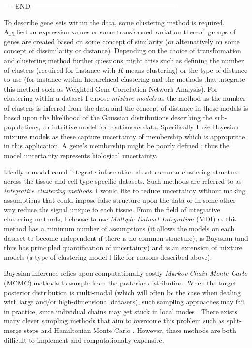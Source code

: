 \documentclass[12pt]{article} %
\begin{document}
	---- END -----------------------------------------------------------------
	
	To describe gene sets within the data, some clustering method is required. Applied on expression values or some transformed variation thereof, groups of genes are created based on some concept of similarity (or alternatively on some concept of dissimilarity or distance). Depending on the choice of transformation and clustering method further questions might arise such as defining the number of clusters (required for instance with $K$-means clustering) or the type of distance to use (for instance within hierarchical clustering and the methods that integrate this method such as Weighted Gene Correlation Network Analysis). For clustering within a dataset I choose \emph{mixture models} as the method as the number of clusters is inferred from the data and the concept of distance in these models is based upon the likelihood of the Gaussian distributions describing the sub-populations, an intuitive model for continuous data. Specifically I use Bayesian mixture models as these capture uncertainty of membership which is appropriate in this application. A gene's membership might be poorly defined \cite{Pita-JuarezPathwayCoexpressionNetwork2018}; thus the model uncertainty represents biological uncertainty.
	
	Ideally a model could integrate information about common clustering structure across the tissue and cell-type specific datasets. Such methods are referred to as \emph{integrative clustering methods}. I would like to reduce uncertainty without making assumptions that could impose false structure upon the data or in some other way reduce the signal unique to each tissue. From the field of integrative clustering methods, I choose to use \emph{Multiple Dataset Integration} (MDI) \cite{KirkBayesiancorrelatedclustering2012} as this method has a minimum number of assumptions (it allows the models on each dataset to become independent if there is no common structure), is Bayesian (and thus has principled quantification of uncertainty) and is an extension of mixture models (a type of clustering model I like for reasons described above).
	
	Bayesian inference relies upon computationally costly \emph{Markov Chain Monte Carlo} (MCMC) methods to sample from the posterior distribution. When the target posterior distribution is multi-modal (which will often be the case when dealing with large and/or high-dimensional datasets), such sampling approaches may fail in practice, since individual chains may get stuck in local modes \cite{TjelmelandModeJumpingProposals2001}. There exists many clever sampling methods that aim to overcome this problem such as split-merge steps \cite{dahl_sequentially-allocated_2005} and Hamiltonian Monte Carlo \cite{duane1987hybrid} \cite{hoffman2014no}. However, these methods are both difficult to implement and computationally expensive.
	
\end{document}
